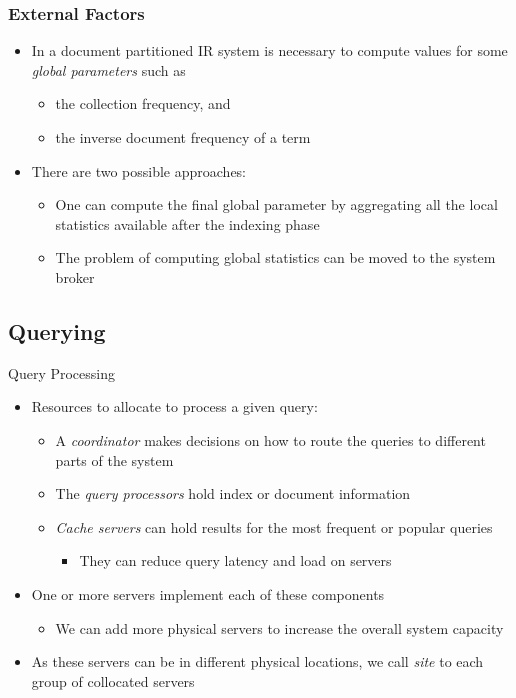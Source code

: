 \documentclass{beamer}
\begin{document}
\begin{frame}
    \frametitle{External Factors}
    \begin{itemize}
    \item In a document partitioned IR system is necessary to compute values
        for some \emph{global parameters} such as
        \begin{itemize}
        \item the collection frequency, and
        \item the inverse document frequency of a term
        \end{itemize}
    \item There are two possible approaches:
        \begin{itemize}
        \item One can compute the final global parameter by aggregating all the
            local statistics available after the indexing phase
        \item The problem of computing global statistics can be moved to the
            system broker
        \end{itemize}
    \end{itemize}
\end{frame}

\subsection{Querying}

\begin{frame}{Query Processing}
    \begin{itemize}
    \item Resources to allocate to process a given query:
        \begin{itemize}
        \item A \emph{coordinator} makes decisions on how to route the queries
            to different parts of the system
        \item The \emph{query processors} hold index or document information
        \item \emph{Cache servers} can hold results for the most frequent or
            popular queries
            \begin{itemize}
            \item They can reduce query latency and load on servers
            \end{itemize}
        \end{itemize}
    \item One or more servers implement each of these components
        \begin{itemize}
        \item We can add more physical servers to increase the overall system
            capacity
        \end{itemize}
    \item As these servers can be in different physical locations, we call
        \emph{site} to each group of collocated servers
    \end{itemize}
\end{frame}
\end{document}
